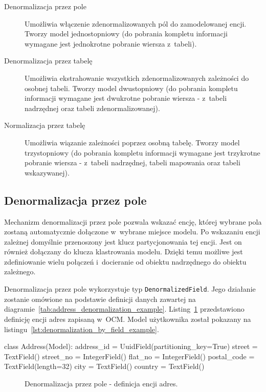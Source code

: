 \begin{description}
	\item[Denormalizacja przez pole] Umożliwia włączenie zdenormalizowanych pól do zamodelowanej encji. Tworzy model jednostopniowy (do pobrania kompletu informacji wymagane jest jednokrotne pobranie wiersza z~tabeli).
	\item[Denormalizacja przez tabelę] Umożliwia ekstrahowanie wszystkich zdenormalizowanych zależności do osobnej tabeli. Tworzy model dwustopniowy (do pobrania kompletu informacji wymagane jest dwukrotne pobranie wiersza - z~tabeli nadrzędnej oraz tabeli zdenormalizowanej).
	\item[Normalizacja przez tabelę] Umożliwia wiązanie zależności poprzez osobną tabelę. Tworzy model trzystopniowy (do pobrania kompletu informacji wymagane jest trzykrotne pobranie wiersza - z~tabeli nadrzędnej, tabeli mapowania oraz tabeli wskazywanej).
\end{description}

\subsection{Denormalizacja przez pole}

Mechanizm denormalizacji przez pole pozwala wskazać encję, której wybrane pola zostaną automatycznie dołączone w~wybrane miejsce modelu. Po wskazaniu encji zależnej domyślnie przenoszony jest klucz partycjonowania tej encji. Jest on również dołączany do klucza klastrowania modelu. Dzięki temu możliwe jest zdefiniowanie wielu połączeń i~docieranie od obiektu nadrzędnego do obiektu zależnego. 

Denormalizacja przez pole wykorzystuje typ \verb+DenormalizedField+. Jego działanie zostanie omówione na podstawie definicji danych zawartej na diagramie~\ref{tab:address_denormalization_example}. Listing~\ref{lst:denormalization_by_field_address_entity} przedstawiono definicję encji adres zapisaną w~OCM. Model użytkownika został pokazany na listingu~\ref{lst:denormalization_by_field_example}. 

\begin{verbbox}
class Address(Model):
    address_id = UuidField(partitioning_key=True)
    street = TextField()
    street_no = IntegerField()
    flat_no = IntegerField()
    postal_code = TextField(length=32)
    city = TextField()
    country = TextField()
\end{verbbox}

\begin{figure}[ht!]
	\centering
	\theverbbox
	\caption{Denormalizacja przez pole - definicja encji adres.}
	\label{lst:denormalization_by_field_address_entity}
\end{figure}

